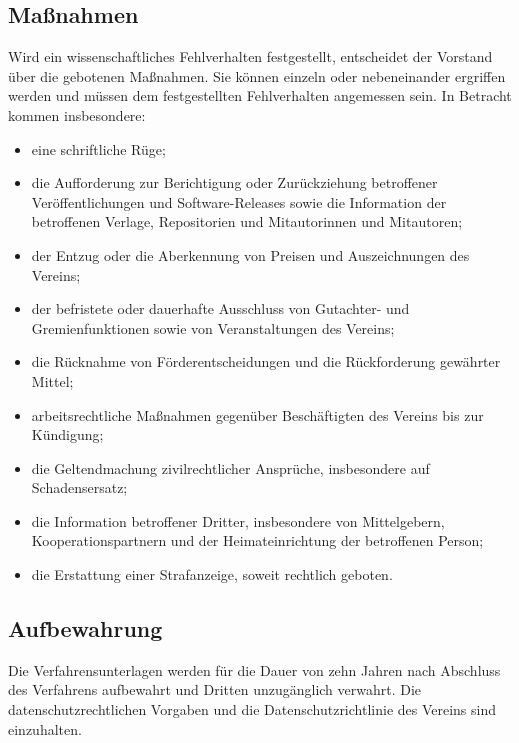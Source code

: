 \documentclass[a4paper, fontsize=11pt]{scrartcl}
\begin{document}
\subsection{Maßnahmen}
Wird ein wissenschaftliches Fehlverhalten festgestellt, entscheidet der Vorstand über die gebotenen Maßnahmen. Sie können einzeln oder nebeneinander ergriffen werden und müssen dem festgestellten Fehlverhalten angemessen sein. In Betracht kommen insbesondere:
\begin{itemize}
  \item eine schriftliche Rüge;
  \item die Aufforderung zur Berichtigung oder Zurückziehung betroffener Veröffentlichungen und Software-Releases sowie die Information der betroffenen Verlage, Repositorien und Mitautorinnen und Mitautoren;
  \item der Entzug oder die Aberkennung von Preisen und Auszeichnungen des Vereins;
  \item der befristete oder dauerhafte Ausschluss von Gutachter- und Gremienfunktionen sowie von Veranstaltungen des Vereins;
  \item die Rücknahme von Förderentscheidungen und die Rückforderung gewährter Mittel;
  \item arbeitsrechtliche Maßnahmen gegenüber Beschäftigten des Vereins bis zur Kündigung;
  \item die Geltendmachung zivilrechtlicher Ansprüche, insbesondere auf Schadensersatz;
  \item die Information betroffener Dritter, insbesondere von Mittelgebern, Kooperationspartnern und der Heimateinrichtung der betroffenen Person;
  \item die Erstattung einer Strafanzeige, soweit rechtlich geboten.
\end{itemize}

\subsection{Aufbewahrung}
Die Verfahrensunterlagen werden für die Dauer von zehn Jahren nach Abschluss des Verfahrens aufbewahrt und Dritten unzugänglich verwahrt. Die datenschutzrechtlichen Vorgaben und die Datenschutzrichtlinie des Vereins sind einzuhalten.
\end{document}
